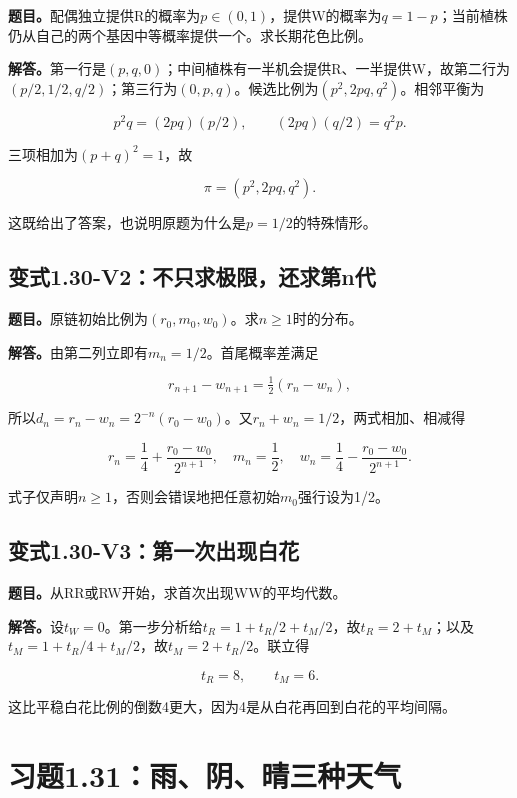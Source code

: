 \documentclass[
  11pt,
  a4paper,
  UTF8,
  fontset=fandol]{ctexart}
\begin{document}
\textbf{题目。}配偶独立提供R的概率为\(p\in(0,1)\)，提供W的概率为\(q=1-p\)；当前植株仍从自己的两个基因中等概率提供一个。求长期花色比例。

\textbf{解答。}第一行是\((p,q,0)\)；中间植株有一半机会提供R、一半提供W，故第二行为\((p/2,1/2,q/2)\)；第三行为\((0,p,q)\)。候选比例为\((p^2,2pq,q^2)\)。相邻平衡为

\[
p^2q=(2pq)(p/2),\qquad (2pq)(q/2)=q^2p.
\]

三项相加为\((p+q)^2=1\)，故

\[
\boxed{\pi=(p^2,2pq,q^2).}
\]

这既给出了答案，也说明原题为什么是\(p=1/2\)的特殊情形。

\subsection{变式1.30-V2：不只求极限，还求第n代}\label{ux53d8ux5f0f1.30-v2ux4e0dux53eaux6c42ux6781ux9650ux8fd8ux6c42ux7b2cnux4ee3}

\textbf{题目。}原链初始比例为\((r_0,m_0,w_0)\)。求\(n\ge1\)时的分布。

\textbf{解答。}由第二列立即有\(m_n=1/2\)。首尾概率差满足

\[
r_{n+1}-w_{n+1}=\tfrac12(r_n-w_n),
\]

所以\(d_n=r_n-w_n=2^{-n}(r_0-w_0)\)。又\(r_n+w_n=1/2\)，两式相加、相减得

\[
\boxed{r_n=\frac14+\frac{r_0-w_0}{2^{n+1}},\quad
m_n=\frac12,\quad
w_n=\frac14-\frac{r_0-w_0}{2^{n+1}}.}
\]

式子仅声明\(n\ge1\)，否则会错误地把任意初始\(m_0\)强行设为1/2。

\subsection{变式1.30-V3：第一次出现白花}\label{ux53d8ux5f0f1.30-v3ux7b2cux4e00ux6b21ux51faux73b0ux767dux82b1}

\textbf{题目。}从RR或RW开始，求首次出现WW的平均代数。

\textbf{解答。}设\(t_W=0\)。第一步分析给\(t_R=1+t_R/2+t_M/2\)，故\(t_R=2+t_M\)；以及\(t_M=1+t_R/4+t_M/2\)，故\(t_M=2+t_R/2\)。联立得

\[
\boxed{t_R=8,\qquad t_M=6.}
\]

这比平稳白花比例的倒数4更大，因为4是从白花再回到白花的平均间隔。

\section{习题1.31：雨、阴、晴三种天气}\label{ux4e60ux98981.31ux96e8ux9634ux6674ux4e09ux79cdux5929ux6c14}
\end{document}
